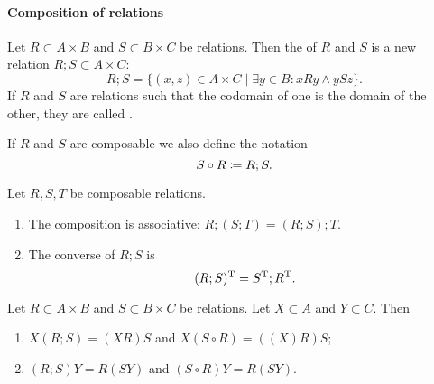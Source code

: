 \paragraph{Composition of relations}
\begin{definition}
Let $R\subset A\times B$ and $S\subset B\times C$ be relations. Then the  of $R$ and $S$ is a new relation $R;S \subset A\times C$:
\[ R;S = \{ (x,z)\in A\times C\;|\; \exists y\in B: xRy \land ySz \}. \]
If $R$ and $S$ are relations such that the codomain of one is the domain of the other, they are called .

If $R$ and $S$ are composable we also define the notation
\[ S\circ R \coloneqq R;S. \]
\end{definition}
\begin{lemma}
Let $R,S,T$ be composable relations.
\begin{enumerate}
\item The composition is associative: $R;(S;T) = (R;S);T$.
\item The converse of $R;S$ is
\[ (R;S)^{\mathrm{T}} = S^{\mathrm{T}} ; R^{\mathrm{T}}. \]
\end{enumerate}
\end{lemma}

\begin{lemma}
Let $R\subset A\times B$ and $S\subset B\times C$ be relations. Let $X\subset A$ and $Y\subset C$. Then
\begin{enumerate}
\item $X(R;S) = (XR)S$ and $X(S\circ R) = ((X)R)S$;
\item $(R;S)Y = R(SY)$ and $(S\circ R)Y = R(SY)$.
\end{enumerate}
\end{lemma}

